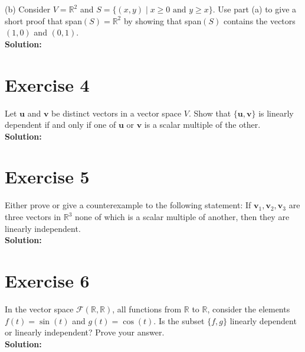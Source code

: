 \documentclass{article}
\begin{document}
\noindent
(b) Consider $V = \mathbb{R}^2$ and $S = \{(x,y) \mid x \geq 0 \text{ and } y \geq x\}$. Use part (a) to give a short proof that span$(S) = \mathbb{R}^2$ by showing that span$(S)$ contains the vectors $(1,0)$ and $(0,1)$. \\

\textbf{Solution:}
\newpage

\section*{Exercise 4}
Let $\mathbf{u}$ and $\mathbf{v}$ be distinct vectors in a vector space $V$. Show that $\{\mathbf{u}, \mathbf{v}\}$ is linearly dependent if and only if one of $\mathbf{u}$ or $\mathbf{v}$ is a scalar multiple of the other. \\

\textbf{Solution:}
\newpage

\section*{Exercise 5}
Either prove or give a counterexample to the following statement: If $\mathbf{v}_1, \mathbf{v}_2, \mathbf{v}_3$ are three vectors in $\mathbb{R}^3$ none of which is a scalar multiple of another, then they are linearly independent. \\

\textbf{Solution:}
\newpage

\section*{Exercise 6}
In the vector space $\mathcal{F}(\mathbb{R},\mathbb{R})$, all functions from $\mathbb{R}$ to $\mathbb{R}$, consider the elements $f(t) = \sin(t)$ and $g(t) = \cos(t)$. Is the subset $\{f,g\}$ linearly dependent or linearly independent? Prove your answer. \\

\textbf{Solution:}
\end{document}

